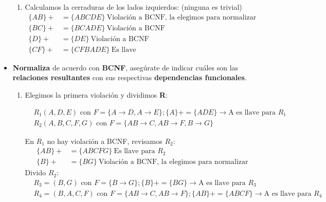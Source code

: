 \begin{itemize}
\begin{enumerate}[label=\alph*.]
        \item 
        Calculamos la cerraduras de los lados izquierdos: (ninguna es trivial)
        \begin{align*}
            \{AB\}+ &= \{ABCDE\} \ \text{Violación a BCNF, la elegimos para normalizar} \\
            \{BC\}+ &= \{BCADE\} \ \text{Violación a BCNF} \\
            \{D\}+ &= \{DE\} \ \text{Violación a BCNF} \\
            \{CF\}+ &= \{CFBADE\} \ \text{Es llave}
        \end{align*}
    \end{enumerate}
    \vspace{.3cm}

    \item \textbf{Normaliza} de acuerdo con \textbf{BCNF}, asegúrate de indicar cuáles son las \textbf{relaciones resultantes} con sus respectivas \textbf{dependencias funcionales}. \vspace{.3cm}
    
    \begin{enumerate}[label=\alph*.]
        \item 
        Elegimos la primera violación y dividimos \textbf{R}:

        \begin{align*}
            &R_1 (A,D,E) \text{ con } F = \{ A \rightarrow D, A \rightarrow E \} ; \{A\}+ = \{ADE\} \xrightarrow{} \text{A es llave para } R_1 \\ %
            &R_2 (A,B,C,F,G) \text{ con } F = \{AB \rightarrow C, AB \rightarrow F, B \rightarrow G\} %
        \end{align*}

        En $R_1$ no hay violación a BCNF, revisamos $R_2$:
        \begin{align*}
            \{AB\}+ &= \{ABCFG\} \ \text{Es llave para } R_2 \\
            \{B\}+ &= \{BG\} \ \text{Violación a BCNF, la elegimos para normalizar}
        \end{align*}
        Divido $R_2$:
        \begin{align*}
            &R_3 = (B,G) \text{ con } F = \{B \rightarrow G\} ; \{B\}+ = \{BG\} \xrightarrow{} \text{A es llave para } R_3\\
            &R_4 = (B,A,C,F) \text{ con } F = \{AB \rightarrow C, AB \rightarrow F\} ; \{AB\}+ = \{ABCF\} \xrightarrow{} \text{A es llave para } R_4
        \end{align*}


\end{enumerate}
\end{itemize}
